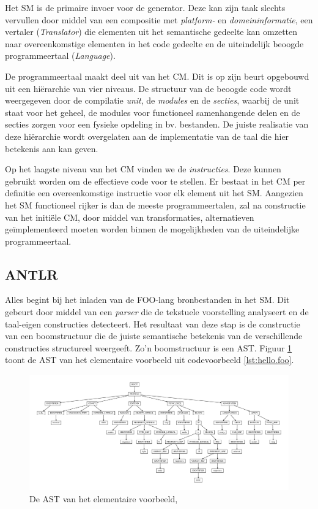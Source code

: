 Het SM is de primaire invoer voor de generator. Deze kan zijn taak slechts
vervullen door middel van een compositie met \emph{platform-} en
\emph{domeininformatie}, een vertaler (\emph{Translator}) die elementen uit het
semantische gedeelte kan omzetten naar overeenkomstige elementen in het code
gedeelte en de uiteindelijk beoogde programmeertaal (\emph{Language}).

De programmeertaal maakt deel uit van het CM. Dit is op zijn beurt opgebouwd
uit een hi\"erarchie van vier niveaus. De structuur van de beoogde code wordt
weergegeven door de compilatie \emph{unit}, de \emph{modules} en de
\emph{secties}, waarbij de unit staat voor het geheel, de modules voor
functioneel samenhangende delen en de secties zorgen voor een fysieke opdeling
in bv. bestanden. De juiste realisatie van deze hi\"erarchie wordt overgelaten
aan de implementatie van de taal die hier betekenis aan kan geven.

Op het laagste niveau van het CM vinden we de \emph{instructies}. Deze kunnen
gebruikt worden om de effectieve code voor te stellen. Er bestaat in het CM per
definitie een overeenkomstige instructie voor elk element uit het SM. Aangezien
het SM functioneel rijker is dan de meeste programmeertalen, zal na constructie
van het initi\"ele CM, door middel van transformaties, alternatieven
ge\"implementeerd moeten worden binnen de mogelijkheden van de uiteindelijke
programmeertaal.

\subsection{ANTLR}
\label{subsection:devel-antlr}

Alles begint bij het inladen van de FOO-lang bronbestanden in het SM. Dit
gebeurt door middel van een \emph{parser} die de tekstuele voorstelling
analyseert en de taal-eigen constructies detecteert. Het resultaat van deze
stap is de constructie van een boomstructuur die de juiste semantische
betekenis van de verschillende constructies structureel weergeeft. Zo'n
boomstructuur is een AST. Figuur \ref{fig:devel-ast} toont de AST van het
elementaire voorbeeld uit codevoorbeeld \ref{lst:hello.foo}.

\begin{figure}[ht]
  \centering
  \includegraphics[width=\linewidth]{resources/hello_ast.pdf}
  \caption{De AST van het elementaire voorbeeld, }
  \label{fig:devel-ast}
\end{figure}

